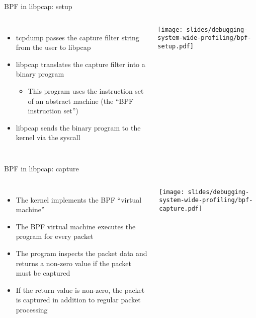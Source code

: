\begin{frame}{BPF in libpcap: setup}
  \begin{columns}
    \begin{itemize}
    \item tcpdump passes the capture filter string from the user to libpcap
    \item libpcap translates the capture filter into a binary program
      \begin{itemize}
      \item This program uses the instruction set of an abstract machine
        (the ``BPF instruction set'')
      \end{itemize}
    \item libpcap sends the binary program to the kernel via the
       syscall
    \end{itemize}
      \texttt{[image: slides/debugging-system-wide-profiling/bpf-setup.pdf]}
  \end{columns}
\end{frame}

\begin{frame}{BPF in libpcap: capture}
  \begin{columns}
    \begin{itemize}
    \item The kernel implements the BPF ``virtual machine''
    \item The BPF virtual machine executes the program for every packet
    \item The program inspects the packet data and returns a non-zero value
      if the packet must be captured
    \item If the return value is non-zero, the packet is captured in
      addition to regular packet processing
    \end{itemize}
      \texttt{[image: slides/debugging-system-wide-profiling/bpf-capture.pdf]}
  \end{columns}
\end{frame}


